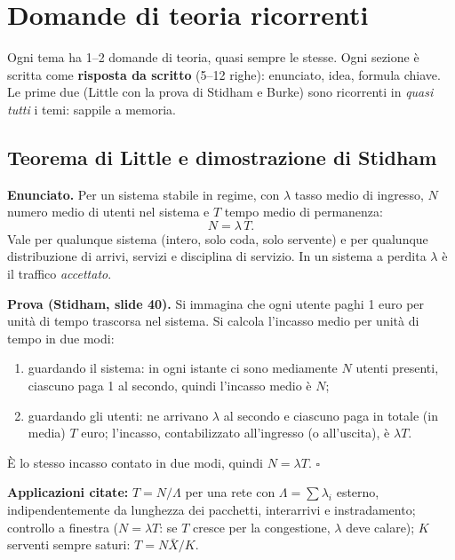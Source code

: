 \chapter{Domande di teoria ricorrenti}\label{cap:teoria}

\begin{nota}
Ogni tema ha 1--2 domande di teoria, quasi sempre le stesse. Ogni sezione è scritta come \textbf{risposta da scritto} (5--12 righe): enunciato, idea, formula chiave. Le prime due (Little con la prova di Stidham e Burke) sono ricorrenti in \emph{quasi tutti} i temi: sappile a memoria.
\end{nota}

\section{Teorema di Little e dimostrazione di Stidham}
\textbf{Enunciato.} Per un sistema stabile in regime, con $\lambda$ tasso medio di ingresso, $N$ numero medio di utenti nel sistema e $T$ tempo medio di permanenza:
\[
N=\lambda\,T .
\]
Vale per qualunque sistema (intero, solo coda, solo servente) e per qualunque distribuzione di arrivi, servizi e disciplina di servizio. In un sistema a perdita $\lambda$ è il traffico \emph{accettato}.

\textbf{Prova (Stidham, slide 40).} Si immagina che ogni utente paghi 1 euro per unità di tempo trascorsa nel sistema. Si calcola l'incasso medio per unità di tempo in due modi:
\begin{enumerate}[nosep]
\item guardando il sistema: in ogni istante ci sono mediamente $N$ utenti presenti, ciascuno paga 1 al secondo, quindi l'incasso medio è $N$;
\item guardando gli utenti: ne arrivano $\lambda$ al secondo e ciascuno paga in totale (in media) $T$ euro; l'incasso, contabilizzato all'ingresso (o all'uscita), è $\lambda T$.
\end{enumerate}
È lo stesso incasso contato in due modi, quindi $N=\lambda T$. \hfill$\square$

\textbf{Applicazioni citate:} $T=N/\Lambda$ per una rete con $\Lambda=\sum\lambda_i$ esterno, indipendentemente da lunghezza dei pacchetti, interarrivi e instradamento; controllo a finestra ($N=\lambda T$: se $T$ cresce per la congestione, $\lambda$ deve calare); $K$ serventi sempre saturi: $T=N\bar X/K$.

